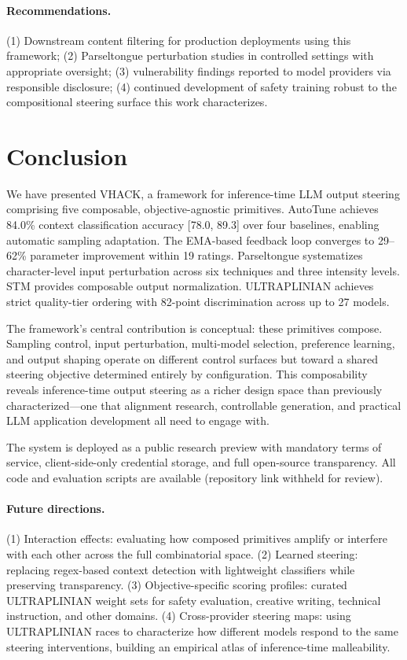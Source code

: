 \documentclass[11pt]{article}
\begin{document}
\paragraph{Recommendations.} (1) Downstream content filtering for production deployments using this framework; (2) Parseltongue perturbation studies in controlled settings with appropriate oversight; (3) vulnerability findings reported to model providers via responsible disclosure; (4) continued development of safety training robust to the compositional steering surface this work characterizes.

\section{Conclusion}

We have presented \textsc{VHACK}, a framework for inference-time LLM output steering comprising five composable, objective-agnostic primitives. AutoTune achieves 84.0\% context classification accuracy [78.0, 89.3] over four baselines, enabling automatic sampling adaptation. The EMA-based feedback loop converges to 29--62\% parameter improvement within 19 ratings. Parseltongue systematizes character-level input perturbation across six techniques and three intensity levels. STM provides composable output normalization. ULTRAPLINIAN achieves strict quality-tier ordering with 82-point discrimination across up to 27 models.

The framework's central contribution is conceptual: these primitives compose. Sampling control, input perturbation, multi-model selection, preference learning, and output shaping operate on different control surfaces but toward a shared steering objective determined entirely by configuration. This composability reveals inference-time output steering as a richer design space than previously characterized---one that alignment research, controllable generation, and practical LLM application development all need to engage with.

The system is deployed as a public research preview with mandatory terms of service, client-side-only credential storage, and full open-source transparency. All code and evaluation scripts are available (repository link withheld for review).

\paragraph{Future directions.} (1) Interaction effects: evaluating how composed primitives amplify or interfere with each other across the full combinatorial space. (2) Learned steering: replacing regex-based context detection with lightweight classifiers while preserving transparency. (3) Objective-specific scoring profiles: curated ULTRAPLINIAN weight sets for safety evaluation, creative writing, technical instruction, and other domains. (4) Cross-provider steering maps: using ULTRAPLINIAN races to characterize how different models respond to the same steering interventions, building an empirical atlas of inference-time malleability.
\end{document}
